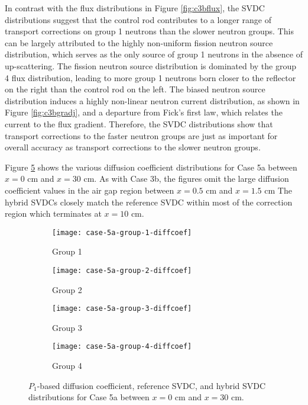 In contrast with the flux distributions in Figure \ref{fig:c3bflux}, the \gls{SVDC} distributions
suggest that the control rod contributes to a longer range of transport corrections on group 1
neutrons than the slower neutron groups. This can be largely attributed to the highly non-uniform
fission neutron source distribution, which serves as the only source of group 1 neutrons in the
absence of up-scattering. The fission neutron source distribution is dominated by the group 4 flux
distribution, leading to more group 1 neutrons born closer to the reflector on the right than the
control rod on the left. The biased neutron source distribution induces a highly non-linear neutron
current distribution, as shown in Figure \ref{fig:c3bgradj}, and a departure from Fick's first law,
which relates the current to the flux gradient. Therefore, the \gls{SVDC} distributions show that
transport corrections to the faster neutron groups are just as important for overall accuracy as
transport corrections to the slower neutron groups.

Figure \ref{fig:c5adiffcoef} shows the various diffusion coefficient distributions for Case 5a
between $x=0$ cm and $x=30$ cm. As with Case 3b, the figures omit the large diffusion coefficient
values in the air gap region between $x=0.5$ cm and $x=1.5$ cm  The hybrid \glspl{SVDC} closely match
the reference \gls{SVDC} within most of the correction region which terminates at $x=10$ cm.

\begin{figure}[htb!]
  \centering
  \begin{subfigure}[t]{.49\textwidth}
    \centering
    \texttt{[image: case-5a-group-1-diffcoef]}
    \caption{Group 1}
    \label{fig:c5ag1dc}
  \end{subfigure}
  \hfill
  \begin{subfigure}[t]{.49\textwidth}
    \centering
    \texttt{[image: case-5a-group-2-diffcoef]}
    \caption{Group 2}
    \label{fig:c5ag2dc}
  \end{subfigure}
  \begin{subfigure}[t]{.49\textwidth}
    \centering
    \texttt{[image: case-5a-group-3-diffcoef]}
    \caption{Group 3}
    \label{fig:c5ag3dc}
  \end{subfigure}
  \hfill
  \begin{subfigure}[t]{.49\textwidth}
    \centering
    \texttt{[image: case-5a-group-4-diffcoef]}
    \caption{Group 4}
    \label{fig:c5ag4dc}
  \end{subfigure}
  \caption{$P_1$-based diffusion coefficient, reference \gls{SVDC}, and hybrid \gls{SVDC}
    distributions for Case 5a between $x=0$ cm and $x=30$ cm.}
  \label{fig:c5adiffcoef}
\end{figure}

